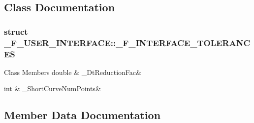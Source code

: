 \subsection{Class Documentation}
\label{struct___f___u_s_e_r___i_n_t_e_r_f_a_c_e_1_1___f___i_n_t_e_r_f_a_c_e___t_o_l_e_r_a_n_c_e_s}
\hypertarget{struct___f___u_s_e_r___i_n_t_e_r_f_a_c_e_struct___f___u_s_e_r___i_n_t_e_r_f_a_c_e_1_1___f___i_n_t_e_r_f_a_c_e___t_o_l_e_r_a_n_c_e_s}{}
\subsubsection{struct \+\_\+\+F\+\_\+\+U\+S\+E\+R\+\_\+\+I\+N\+T\+E\+R\+F\+A\+CE\+:\+:\+\_\+\+F\+\_\+\+I\+N\+T\+E\+R\+F\+A\+C\+E\+\_\+\+T\+O\+L\+E\+R\+A\+N\+C\+ES}
\begin{DoxyFields}{Class Members}
double\hypertarget{struct___f___u_s_e_r___i_n_t_e_r_f_a_c_e_a45af07936830dae87b41ae244e62135c}{}\label{struct___f___u_s_e_r___i_n_t_e_r_f_a_c_e_a45af07936830dae87b41ae244e62135c}
&
\+\_\+\+Dt\+Reduction\+Fac&
\\
\hline

int\hypertarget{struct___f___u_s_e_r___i_n_t_e_r_f_a_c_e_a2357fea12959f6252ec96bb0c3c1bd15}{}\label{struct___f___u_s_e_r___i_n_t_e_r_f_a_c_e_a2357fea12959f6252ec96bb0c3c1bd15}
&
\+\_\+\+Short\+Curve\+Num\+Points&
\\
\hline

\end{DoxyFields}


\subsection{Member Data Documentation}
